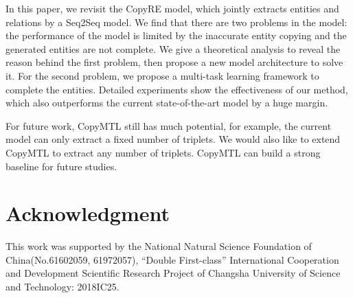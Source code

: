 \documentclass[letterpaper]{article} \usepackage{aaai20}  \usepackage{times}  \usepackage{helvet} \usepackage{courier}  \usepackage[hyphens]{url}  \usepackage{graphicx}
\begin{document}
  In this paper, we revisit the CopyRE model, which jointly extracts entities and relations by a Seq2Seq model. We find that there are two problems in the model: the performance of the model is limited by the inaccurate entity copying and the generated entities are not complete. We give a theoretical analysis to reveal the reason behind the first problem, then propose a new model architecture to solve it. For the second problem, we propose a multi-task learning framework to complete the entities. Detailed experiments show the effectiveness of our method, which also outperforms the current state-of-the-art model by a huge margin.
  
  For future work, CopyMTL still has much potential, for example, the current model can only extract a fixed number of triplets. We would also like to extend CopyMTL to extract any number of triplets. CopyMTL can build a strong baseline for future studies.

  \section*{Acknowledgment}
  This work was supported by the National Natural Science Foundation of China(No.61602059, 61972057), ``Double First-class'' International Cooperation and Development Scientific Research Project of Changsha University of Science and Technology: 2018IC25. 
\fontsize{9.5pt}{10.5pt} \selectfont


\end{document}
